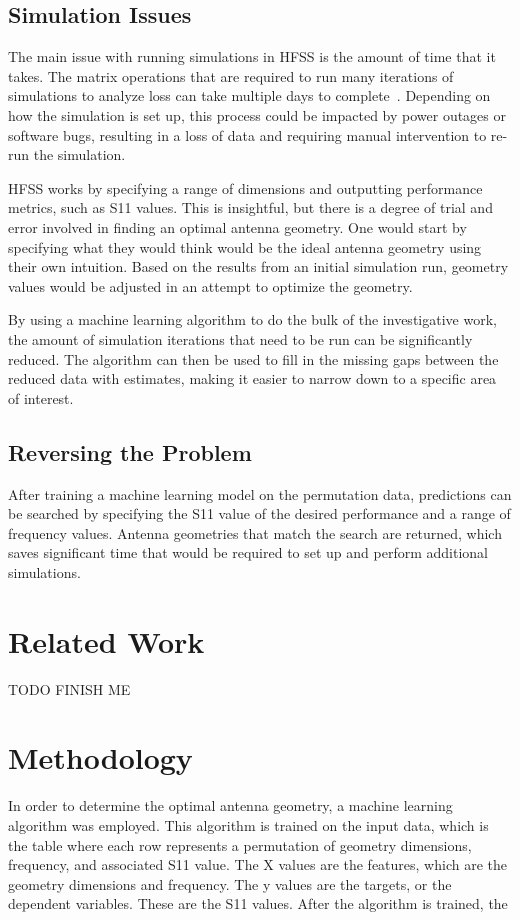 \documentclass[11pt, notitlepage]{article}
\begin{document}
\begin{multicols}{2}
\subsection{Simulation Issues}
The main issue with running simulations in HFSS is the amount of time that it takes. The matrix operations that are required to run many iterations of simulations to analyze loss can take multiple days to complete~\cite{john_antenna_2009}. Depending on how the simulation is set up, this process could be impacted by power outages or software bugs, resulting in a loss of data and requiring manual intervention to re-run the simulation. 

HFSS works by specifying a range of dimensions and outputting performance metrics, such as S11 values. This is insightful, but there is a degree of trial and error involved in finding an optimal antenna geometry. One would start by specifying what they would think would be the ideal antenna geometry using their own intuition. Based on the results from an initial simulation run, geometry values would be adjusted in an attempt to optimize the geometry.

By using a machine learning algorithm to do the bulk of the investigative work, the amount of simulation iterations that need to be run can be significantly reduced. The algorithm can then be used to fill in the missing gaps between the reduced data with estimates, making it easier to narrow down to a specific area of interest. 

\subsection{Reversing the Problem}
After training a machine learning model on the permutation data, predictions can be searched by specifying the S11 value of the desired performance and a range of frequency values. Antenna geometries that match the search are returned, which saves significant time that would be required to set up and perform additional simulations.  


\section{Related Work}
TODO FINISH ME


\section{Methodology}
In order to determine the optimal antenna geometry, a machine learning algorithm was employed. This algorithm is trained on the input data, which is the table where each row represents a permutation of geometry dimensions, frequency, and associated S11 value. The X values are the features, which are the geometry dimensions and frequency. The y values are the targets, or the dependent variables. These are the S11 values. After the algorithm is trained, the 


\end{multicols}
\end{document}
